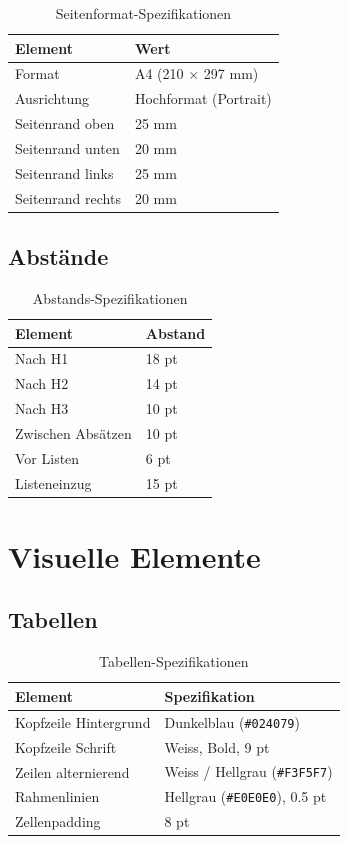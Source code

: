 \begin{table}[h]
\centering
\caption{Seitenformat-Spezifikationen}
\label{tab:page-format}
\begin{tabular}{ll}
\toprule
\textbf{Element} & \textbf{Wert} \\
\midrule
Format & A4 (210 $\times$ 297 mm) \\
Ausrichtung & Hochformat (Portrait) \\
Seitenrand oben & 25 mm \\
Seitenrand unten & 20 mm \\
Seitenrand links & 25 mm \\
Seitenrand rechts & 20 mm \\
\bottomrule
\end{tabular}
\end{table}

\subsection{Abstände}

\begin{table}[h]
\centering
\caption{Abstands-Spezifikationen}
\label{tab:spacing}
\begin{tabular}{ll}
\toprule
\textbf{Element} & \textbf{Abstand} \\
\midrule
Nach H1 & 18 pt \\
Nach H2 & 14 pt \\
Nach H3 & 10 pt \\
Zwischen Absätzen & 10 pt \\
Vor Listen & 6 pt \\
Listeneinzug & 15 pt \\
\bottomrule
\end{tabular}
\end{table}


\section{Visuelle Elemente}
\label{sec:sg-visual}

\subsection{Tabellen}

\begin{table}[h]
\centering
\caption{Tabellen-Spezifikationen}
\label{tab:table-specs}
\begin{tabular}{ll}
\toprule
\textbf{Element} & \textbf{Spezifikation} \\
\midrule
Kopfzeile Hintergrund & Dunkelblau (\texttt{\#024079}) \\
Kopfzeile Schrift & Weiss, Bold, 9 pt \\
Zeilen alternierend & Weiss / Hellgrau (\texttt{\#F3F5F7}) \\
Rahmenlinien & Hellgrau (\texttt{\#E0E0E0}), 0.5 pt \\
Zellenpadding & 8 pt \\
\bottomrule
\end{tabular}
\end{table}

